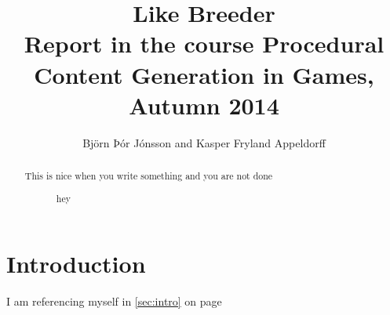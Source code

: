 \documentclass[]{article}
\title{Like Breeder\\ \small Report in the course Procedural Content Generation in Games, Autumn 2014}
\author{Björn Þór Jónsson and Kasper Fryland Appeldorff}
\begin{document}

\listoftodos %
\newpage
\begin{abstract}
This is nice when you write something and you are not done 
\begin{figure}[h!]
\caption{hey}
\label{fig:test}
\end{figure}
\end{abstract}

\section{Introduction}
\label{sec:intro}
I am referencing myself in \autoref{sec:intro} on page \pageref{sec:intro}
\end{document}
